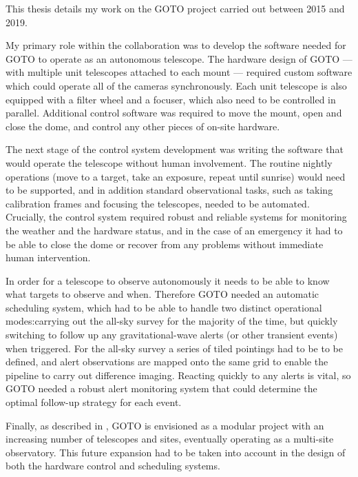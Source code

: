 \begin{colsection}

This thesis details my work on the GOTO project carried out between 2015 and 2019.

My primary role within the collaboration was to develop the software needed for GOTO to operate as an autonomous telescope. The hardware design of GOTO --- with multiple unit telescopes attached to each mount --- required custom software which could operate all of the cameras synchronously. Each unit telescope is also equipped with a filter wheel and a focuser, which also need to be controlled in parallel. Additional control software was required to move the mount, open and close the dome, and control any other pieces of on-site hardware.

The next stage of the control system development was writing the software that would operate the telescope without human involvement. The routine nightly operations (move to a target, take an exposure, repeat until sunrise) would need to be supported, and in addition standard observational tasks, such as taking calibration frames and focusing the telescopes, needed to be automated. Crucially, the control system required robust and reliable systems for monitoring the weather and the hardware status, and in the case of an emergency it had to be able to close the dome or recover from any problems without immediate human intervention.

In order for a telescope to observe autonomously it needs to be able to know what targets to observe and when. Therefore GOTO needed an automatic scheduling system, which had to be able to handle two distinct operational modes:\@ carrying out the all-sky survey for the majority of the time, but quickly switching to follow up any gravitational-wave alerts (or other transient events) when triggered. For the all-sky survey a series of tiled pointings had to be to be defined, and alert observations are mapped onto the same grid to enable the pipeline to carry out difference imaging. Reacting quickly to any alerts is vital, so GOTO needed a robust alert monitoring system that could determine the optimal follow-up strategy for each event.

Finally, as described in , GOTO is envisioned as a modular project with an increasing number of telescopes and sites, eventually operating as a multi-site observatory. This future expansion had to be taken into account in the design of both the hardware control and scheduling systems.


\end{colsection}
